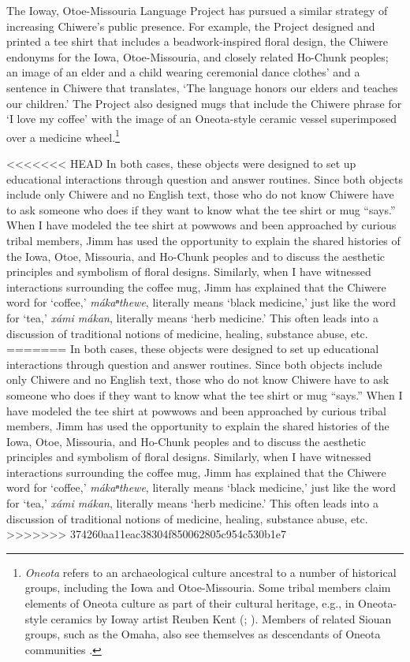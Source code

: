 \documentclass[output=paper]{LSP/langsci}
\begin{document}
The Ioway, Otoe-Missouria Language Project has pursued a similar strategy of increasing Chiwere's public presence. For example, the Project designed and printed a tee shirt that includes a beadwork-inspired floral design, the Chiwere endonyms for the Iowa, Otoe-Missouria, and closely related Ho-Chunk peoples; an image of an elder and a child wearing ceremonial dance clothes' and a sentence in Chiwere that translates, `The language honors our elders and teaches our children.' The Project also designed mugs that include the Chiwere phrase for `I love my coffee' with the image of an Oneota-style ceramic vessel superimposed over a medicine wheel.\footnote{\emph{Oneota} refers to an archaeological culture ancestral to a number of historical groups, including the Iowa and Otoe-Missouria. Some tribal members claim elements of Oneota culture as part of their cultural heritage, e.g., in Oneota-style ceramics by Ioway artist Reuben Kent (\citeyear{KentND}; \citealt{RundleRundle2007}). Members of related Siouan groups, such as the Omaha, also see themselves as descendants of Oneota communities \citep{Buffalohead2004}.}

<<<<<<< HEAD
In both cases, these objects were designed to set up educational interactions through question and answer routines. Since both objects include only Chiwere and no English text, those who do not know Chiwere have to ask someone who does if they want to know what the tee shirt or mug ``says.'' When I have modeled the tee shirt at powwows and been approached by curious tribal members, Jimm has used the opportunity to explain the shared histories of the Iowa, Otoe, Missouria, and Ho-Chunk peoples and to discuss the aesthetic principles and symbolism of floral designs. Similarly, when I have witnessed interactions surrounding the coffee mug, Jimm has explained that the Chiwere word for `coffee,' \emph{mákaⁿthewe}, literally means `black medicine,' just like the word for `tea,' \emph{xámi mákan}, literally means `herb medicine.' This often leads into a discussion of traditional notions of medicine, healing, substance abuse, etc.
=======
In both cases, these objects were designed to set up educational interactions through question and answer routines. Since both objects include only Chiwere and no English text, those who do not know Chiwere have to ask someone who does if they want to know what the tee shirt or mug ``says.'' When I have modeled the tee shirt at powwows and been approached by curious tribal members, Jimm has used the opportunity to explain the shared histories of the Iowa, Otoe, Missouria, and Ho-Chunk peoples and to discuss the aesthetic principles and symbolism of floral designs. Similarly, when I have witnessed interactions surrounding the coffee mug, Jimm has explained that the Chiwere word for `coffee,' \emph{m\'akaⁿthewe}, literally means `black medicine,' just like the word for `tea,' \emph{x\'ami m\'akan}, literally means `herb medicine.' This often leads into a discussion of traditional notions of medicine, healing, substance abuse, etc.
>>>>>>> 374260aa11eac38304f850062805c954c530b1e7
\end{document}
